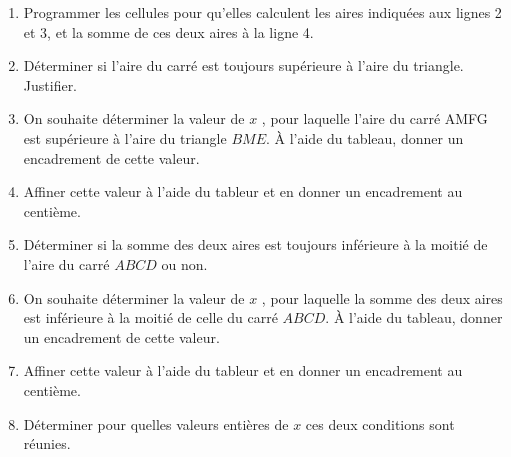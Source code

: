 \begin{exercice*}[\tableurLogo]
\begin{enumerate}
        \smallskip
        \item Programmer les cellules pour qu'elles calculent les aires indiquées aux lignes 2 et 3, et la somme de ces deux aires à la ligne 4.
        \item Déterminer si l'aire du carré est toujours supérieure à l'aire du triangle. Justifier.
        \columnbreak
        \item On souhaite déterminer la valeur de $x$ , pour laquelle l'aire du carré AMFG est supérieure à l'aire du triangle $BME$. À l'aide du tableau, donner un encadrement de cette valeur.
        \item Affiner cette valeur à l'aide du tableur et en donner un encadrement au centième.
        \item Déterminer si la somme des deux aires est toujours inférieure à la moitié de l'aire du carré $ABCD$ ou non.
        \item On souhaite déterminer la valeur de $x$ , pour laquelle la somme des deux aires est inférieure à la moitié de celle du carré $ABCD$. 
        À l'aide du tableau, donner un encadrement de cette valeur.
        \item Affiner cette valeur à l'aide du tableur et en donner un encadrement au centième.
        \item Déterminer pour quelles valeurs entières de $x$ ces deux conditions sont réunies.
    \end{enumerate}
\end{exercice*}

